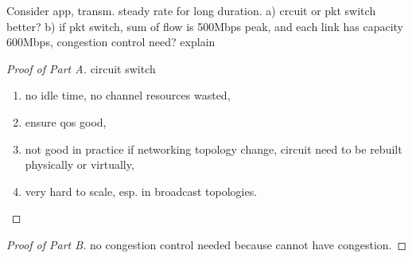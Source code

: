 \documentclass[./answersheet.tex]{subfiles}
\begin{document}
\begin{wts}
    Consider app, transm. steady rate for long duration. a) crcuit or pkt switch better? b) if pkt switch, sum of flow is 500Mbps peak, and each link has capacity 600Mbps, congestion control need? explain
\end{wts}
\begin{proof}[Proof of Part A]
    circuit switch
    \begin{enumerate}[noitemsep]
        \item no idle time, no channel resources wasted,
        \item ensure qos good,
        \item not good in practice if networking topology change, circuit need to be rebuilt physically or virtually,
        \item very hard to scale, esp. in broadcast topologies.
    \end{enumerate}
\end{proof}
\begin{proof}[Proof of Part B]
    no congestion control needed because cannot have congestion.
\end{proof}
\end{document}
